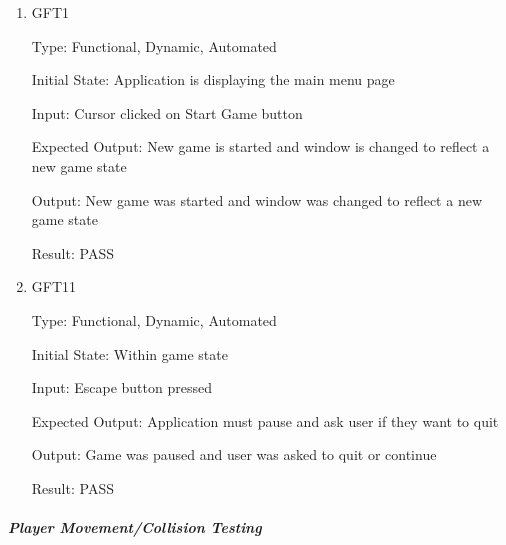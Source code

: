 \documentclass[12pt, titlepage]{article}
\begin{document}
\begin{enumerate}

\item{GFT1\\}

Type: Functional, Dynamic, Automated
					
Initial State: Application is displaying the main menu page
					
Input: Cursor clicked on Start Game button
					
Expected Output: New game is started and window is changed to reflect a new game state

Output: New game was started and window was changed to reflect a new game state

Result: PASS


\item{GFT11\\}

Type: Functional, Dynamic, Automated
					
Initial State: Within game state
					
Input: Escape button pressed
					
Expected Output: Application must pause and ask user if they want to quit

Output: Game was paused and user was asked to quit or continue

Result: PASS

\end{enumerate}

\subparagraph{Player Movement/Collision Testing}
\end{document}
